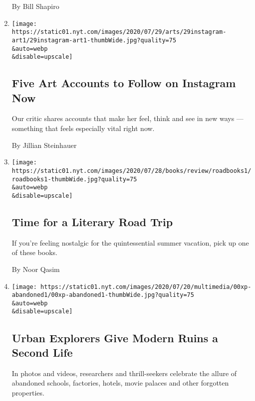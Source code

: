 \begin{enumerate}
  By Bill Shapiro
\item
  \href{/2020/07/29/arts/design/art-accounts-to-follow-instagram.html}{}

  \texttt{[image: https://static01.nyt.com/images/2020/07/29/arts/29instagram-art1/29instagram-art1-thumbWide.jpg?quality=75\\\&auto=webp\\\&disable=upscale]}

  \hypertarget{five-art-accounts-to-follow-on-instagram-now}{%
  \subsection{Five Art Accounts to Follow on Instagram
  Now}\label{five-art-accounts-to-follow-on-instagram-now}}

  Our critic shares accounts that make her feel, think and see in new
  ways --- something that feels especially vital right now.

  By Jillian Steinhauer
\item
  \href{/2020/07/28/books/time-for-a-literary-road-trip.html}{}

  \texttt{[image: https://static01.nyt.com/images/2020/07/28/books/review/roadbooks1/roadbooks1-thumbWide.jpg?quality=75\\\&auto=webp\\\&disable=upscale]}

  \hypertarget{time-for-a-literary-road-trip}{%
  \subsection{Time for a Literary Road
  Trip}\label{time-for-a-literary-road-trip}}

  If you're feeling nostalgic for the quintessential summer vacation,
  pick up one of these books.

  By Noor Qasim
\item
  \href{/2020/07/27/us/abandoned-properties-to-explore.html}{}

  \texttt{[image: https://static01.nyt.com/images/2020/07/20/multimedia/00xp-abandoned1/00xp-abandoned1-thumbWide.jpg?quality=75\\\&auto=webp\\\&disable=upscale]}

  \hypertarget{urban-explorers-give-modern-ruins-a-second-life}{%
  \subsection{Urban Explorers Give Modern Ruins a Second
  Life}\label{urban-explorers-give-modern-ruins-a-second-life}}

  In photos and videos, researchers and thrill-seekers celebrate the
  allure of abandoned schools, factories, hotels, movie palaces and
  other forgotten properties.


\end{enumerate}
